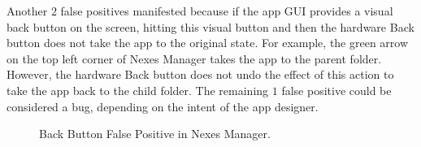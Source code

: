 Another $2$ false positives manifested because if the app GUI provides a visual back button on the screen, hitting this visual button and then the hardware Back button does not take the app to the original state. For example, the green arrow on the top left corner of Nexes Manager takes the app to the parent folder. However, the hardware Back button does not undo the effect of this action to take the app back to the child folder.  The remaining $1$ false positive could be considered a bug, depending on the intent of the app designer.

\begin{figure}[!t]
\centering
\begin{minipage}{.8\columnwidth}
\hfill
{}
\hfill
{}
\caption{Back Button False Positive in Nexes Manager.}
\label{fig:fp1}
\end{minipage}
\end{figure}



